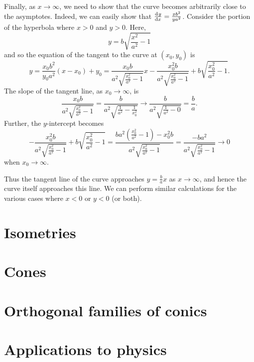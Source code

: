 \documentclass[a4paper,leqno,10pt]{article}
\theoremstyle{exercise}
\theoremstyle{plain}
\theoremstyle{definition}
\theoremstyle{remark}
\begin{document}
Finally, as $ x \to \infty $, we need to show that the curve becomes arbitrarily close to the asymptotes. Indeed, we can easily show
that $ \od{y}{x} = \frac{x b^2}{y a^2} $. Consider the portion of the hyperbola where $ x > 0 $ and $ y > 0 $. Here,
\begin{displaymath}
  y = b\sqrt{\frac{x^2}{a^2} - 1}
\end{displaymath}
and so the equation of the tangent to the curve at $ (x_0, y_0) $ is
\begin{displaymath}
  y = \frac{x_0 b^2}{y_0 a^2} (x - x_0) + y_0
    = \frac{x_0 b}{a^2\sqrt{\frac{x_0^2}{a^2} - 1}} x - \frac{x_0^2 b}{a^2\sqrt{\frac{x_0^2}{a^2} - 1}} + b\sqrt{\frac{x_0^2}{a^2} - 1}.
\end{displaymath}
The slope of the tangent line, as $ x_0 \to \infty $, is
\begin{displaymath}
 \frac{x_0 b}{a^2\sqrt{\frac{x_0^2}{a^2} - 1}} = \frac{b}{a^2\sqrt{\frac{1}{a^2} - \frac{1}{x_0^2}}} \to \frac{b}{a^2\sqrt{\frac{1}{a^2} - 0}} = \frac{b}{a}.
\end{displaymath}
Further, the $ y$-intercept becomes
\begin{displaymath}
  -\frac{x_0^2 b}{a^2\sqrt{\frac{x_0^2}{a^2} - 1}} + b\sqrt{\frac{x_0^2}{a^2} - 1} = \frac{ba^2(\frac{x_0^2}{a^2} - 1)-x_0^2 b}{a^2\sqrt{\frac{x_0^2}{a^2} - 1}}
    = \frac{- ba^2}{a^2\sqrt{\frac{x_0^2}{a^2} - 1}}
    \to 0
\end{displaymath}
when $ x_0 \to \infty $.

Thus the tangent line of the curve approaches $ y = \frac{b}{a} x $ as $ x \to \infty $, and hence the curve itself approaches this line. We can perform similar
calculations for the various cases where $ x < 0 $ or $ y < 0 $ (or both).

\section{Isometries}

\section{Cones}

\section{Orthogonal families of conics}

\section{Applications to physics}
\end{document}

